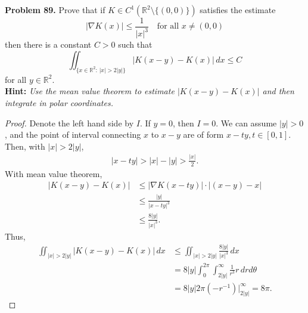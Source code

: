 \documentclass[11pt]{article}
\theoremstyle{definition}
\theoremstyle{definition}
\begin{document}
\medskip

\noindent
{\bf Problem 89.}
Prove that if $K\in C^1(\mathbb{R}^2\setminus
\{ (0,0)\})$ satisfies the estimate
$$
|\nabla K(x)|\leq \frac{1}{|x|^3} \quad \mbox{for all $x\neq (0,0)$}
$$
then there is a constant $C>0$ such that
$$
\iint_{\{x\in\mathbb{R}^2:\, |x|>2|y|\}} |K(x-y)-K(x)|\, dx\leq C
$$
for all $y\in\mathbb{R}^2$.\\
{\bf Hint:} {\em Use the mean value theorem to estimate
	$|K(x-y)-K(x)|$ and then integrate in polar coordinates.}
\begin{proof}
Denote the left hand side by $I$. If $y = 0$, then $I = 0$. We can assume $|y| > 0$, and the point of interval connecting $x$ to $x - y$ are of form $x - ty, t \in [0,1]$. Then, with $|x| > 2|y|$,
\begin{align*}
    |x - ty| > |x| - |y| > \frac{|x|}{2}.
\end{align*}
With mean value theorem, 
\begin{align*}
    |K(x-y) - K(x)| & \leq |\nabla K(x-ty)| \cdot |(x - y) - x| \\
    & \leq \frac{|y|}{|x-ty|^3} \\
    & \leq \frac{8|y|}{|x|^3}.
\end{align*}
Thus,
\begin{align*}
    \iint_{|x|>2|y|} |K(x-y)-K(x)|\, dx & \leq \iint_{|x|>2|y|} \frac{8|y|}{|x|^3}\, dx \\
    & = 8|y| \int^{2\pi}_0 \int^\infty_{2|y|} \frac{1}{r^3}r\, dr d\theta \\
    & = 8|y| 2\pi \left(- r^{-1}\right)\Big|_{2|y|}^\infty = 8 \pi.
\end{align*}
\end{proof}


\medskip
\end{document}
